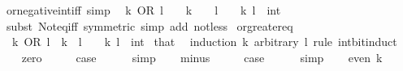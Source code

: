 \begin{isabellebody}
\endisatagproof
{\isafoldproof}%
%
\isadelimproof
\isanewline
%
\endisadelimproof
\isanewline
{}\isamarkupfalse%
\ or{\isacharunderscore}{\kern0pt}negative{\isacharunderscore}{\kern0pt}int{\isacharunderscore}{\kern0pt}iff\ {\isacharbrackleft}{\kern0pt}simp{\isacharbrackright}{\kern0pt}{\isacharcolon}{\kern0pt}\isanewline
\ \ {\isacartoucheopen}k\ OR\ l\ {\isacharless}{\kern0pt}\ {}\ {\isasymlongleftrightarrow}\ k\ {\isacharless}{\kern0pt}\ {}\ {\isasymor}\ l\ {\isacharless}{\kern0pt}\ {}{\isacartoucheclose}\ \ k\ l\ {\isacharcolon}{\kern0pt}{\isacharcolon}{\kern0pt}\ int\isanewline
%
\isadelimproof
\ \ %
\endisadelimproof
%
\isatagproof
{}\isamarkupfalse%
\ {\isacharparenleft}{\kern0pt}subst\ Not{\isacharunderscore}{\kern0pt}eq{\isacharunderscore}{\kern0pt}iff\ {\isacharbrackleft}{\kern0pt}symmetric{\isacharbrackright}{\kern0pt}{\isacharparenright}{\kern0pt}\ {\isacharparenleft}{\kern0pt}simp\ add{\isacharcolon}{\kern0pt}\ not{\isacharunderscore}{\kern0pt}less{\isacharparenright}{\kern0pt}%
\endisatagproof
{\isafoldproof}%
%
\isadelimproof
\isanewline
%
\endisadelimproof
\isanewline
{}\isamarkupfalse%
\ or{\isacharunderscore}{\kern0pt}greater{\isacharunderscore}{\kern0pt}eq{\isacharcolon}{\kern0pt}\isanewline
\ \ {\isacartoucheopen}k\ OR\ l\ {\isasymge}\ k{\isacartoucheclose}\ \ {\isacartoucheopen}l\ {\isasymge}\ {}{\isacartoucheclose}\ \ k\ l\ {\isacharcolon}{\kern0pt}{\isacharcolon}{\kern0pt}\ int\isanewline
%
\isadelimproof
%
\endisadelimproof
%
\isatagproof
{}\isamarkupfalse%
\ that\ \isamarkupfalse%
\ {\isacharparenleft}{\kern0pt}induction\ k\ arbitrary{\isacharcolon}{\kern0pt}\ l\ rule{\isacharcolon}{\kern0pt}\ int{\isacharunderscore}{\kern0pt}bit{\isacharunderscore}{\kern0pt}induct{\isacharparenright}{\kern0pt}\isanewline
\ \ \isamarkupfalse%
\ zero\isanewline
\ \ \isamarkupfalse%
\ \isamarkupfalse%
\ {\isacharquery}{\kern0pt}case\isanewline
\ \ \ \ \isamarkupfalse%
\ simp\isanewline
{}\isamarkupfalse%
\isanewline
\ \ \isamarkupfalse%
\ minus\isanewline
\ \ \isamarkupfalse%
\ \isamarkupfalse%
\ {\isacharquery}{\kern0pt}case\isanewline
\ \ \ \ \isamarkupfalse%
\ simp\isanewline
{}\isamarkupfalse%
\isanewline
\ \ \isamarkupfalse%
\ {\isacharparenleft}{\kern0pt}even\ k{\isacharparenright}{\kern0pt}\isanewline

\end{isabellebody}
